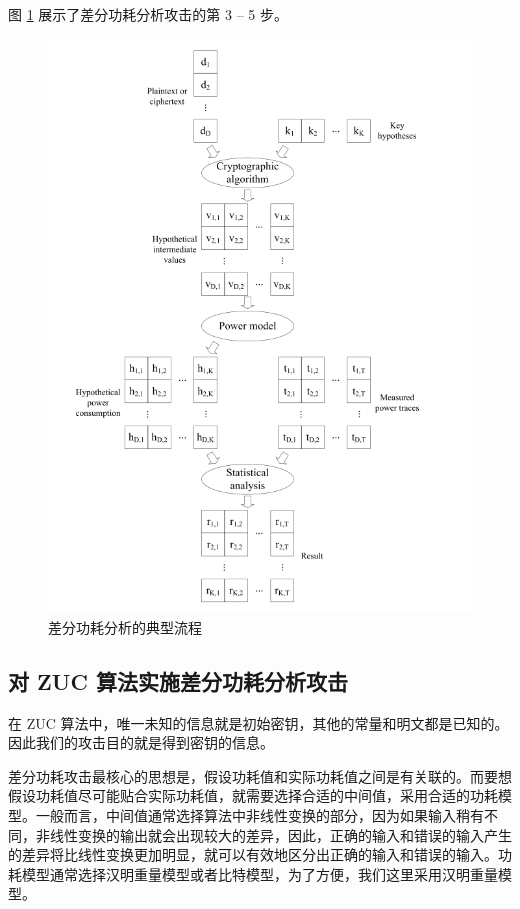 图 \ref{fig:dpa} 展示了差分功耗分析攻击的第 3 -- 5 步。

\begin{figure}[htbp]

    \centering
    \includegraphics[height=.6\textheight]{../images/dpa.png}
    \caption{差分功耗分析的典型流程\cite{paa_en}}
    \label{fig:dpa}
\end{figure}

\subsection{对 ZUC 算法实施差分功耗分析攻击}

在 ZUC 算法中，唯一未知的信息就是初始密钥，其他的常量和明文都是已知的。因此我们的攻击目的就是得到密钥的信息。

差分功耗攻击最核心的思想是，假设功耗值和实际功耗值之间是有关联的。而要想假设功耗值尽可能贴合实际功耗值，就需要选择合适的中间值，采用合适的功耗模型。一般而言，中间值通常选择算法中非线性变换的部分，因为如果输入稍有不同，非线性变换的输出就会出现较大的差异，因此，正确的输入和错误的输入产生的差异将比线性变换更加明显，就可以有效地区分出正确的输入和错误的输入。功耗模型通常选择汉明重量模型或者比特模型，为了方便，我们这里采用汉明重量模型。

